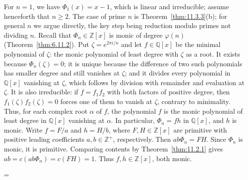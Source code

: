\documentclass[11pt]{article}
\makeatletter
\theoremstyle{ntstyle}
\let\nt@closedisplay\]
\def\nt@guardedclose{\@ifnextchar\par{\nt@closeafterpar}{\@ifnextchar\end{\postdisplaypenalty\@M\nt@closedisplay}{\nt@closedisplay}}}
\def\nt@closeafterpar\par{\@ifnextchar\par{\nt@closeafterpar}{\@ifnextchar\end{\postdisplaypenalty\@M\nt@closedisplay\par}{\nt@closedisplay\par}}}
\renewenvironment{proof}[1][\proofname]{\par
  \pushQED{\qed}\normalfont\topsep\medskipamount\edef\nt@afterproof{\@endparpenalty=\the\@endparpenalty\relax}\@beginparpenalty\@M\@endparpenalty\@M\let\]\nt@guardedclose\trivlist\item[]\textit{#1\@addpunct{.}} \ignorespaces}{\ifvmode\addpenalty\@M\fi\popQED\nt@afterproof\endtrivlist\@endpefalse}
\makeatother
\begin{document}
\begin{proof} For $n=1$, we have $\Phi_1(x)=x-1$, which is linear and
	irreducible; assume henceforth that $n\ge2$. The case of prime $n$ is
	Theorem~\ref{thm:11.3.3}(b); for general $n$ we argue directly, the key step
	being reduction modulo primes not dividing $n$. Recall that $\Phi_n\in\mathbb{Z}[x]$ is monic of
	degree $\varphi(n)$ (Theorem~\ref{thm:6.11.2}). Put $\zeta = e^{2\pi
				i/n}$ and let $f\in\mathbb{Q}[x]$ be the minimal polynomial of
	$\zeta$: the monic polynomial of least degree with $\zeta$ as a root.
	It exists because $\Phi_n(\zeta) = 0$; it is unique because the difference of two
	such polynomials has smaller degree and still vanishes at $\zeta$;
	and it divides every polynomial in $\mathbb{Q}[x]$ vanishing at
	$\zeta$, which follows by division with remainder and evaluation at $\zeta$. It is also
	irreducible: if $f=f_1f_2$ with both factors of positive degree, then
	$f_1(\zeta)f_2(\zeta)=0$ forces one of them to vanish at $\zeta$,
	contrary to minimality. Thus, for each complex root $\alpha$ of $f$, the polynomial $f$ is the
	monic polynomial of least degree in $\mathbb{Q}[x]$ vanishing at $\alpha$. In particular,
	$\Phi_n=fh$ in $\mathbb{Q}[x]$, and $h$ is monic.
	Write $f=F/a$ and $h=H/b$, where $F,H\in\mathbb{Z}[x]$ are
	primitive with positive leading coefficients $a,b\in\mathbb{Z}^+$,
	respectively. Then $ab\Phi_n=FH$. Since $\Phi_n$ is monic, it is
	primitive. Comparing contents by Theorem~\ref{thm:11.2.1} gives
	$ab=c(ab\Phi_n)=c(FH)=1$. Thus $f,h\in\mathbb{Z}[x]$, both monic.


\end{proof}
\end{document}
